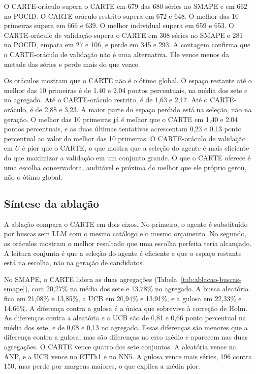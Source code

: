 O CARTE-oráculo supera o CARTE em 679 das 680 séries no SMAPE e em 662 no POCID. O CARTE-oráculo restrito supera em 672 e 648. O melhor das 10 primeiras supera em 666 e 639. O melhor individual supera em 659 e 653. O CARTE-oráculo de validação supera o CARTE em 308 séries no SMAPE e 281 no POCID, empata em 27 e 106, e perde em 345 e 293. A contagem confirma que o CARTE-oráculo de validação não é uma alternativa. Ele vence menos da metade das séries e perde mais do que vence.

Os oráculos mostram que o CARTE não é o ótimo global. O espaço restante até o melhor das 10 primeiras é de 1,40 e 2,04 pontos percentuais, na média dos sete e no agregado. Até o CARTE-oráculo restrito, é de 1,63 e 2,17. Até o CARTE-oráculo, é de 2,88 e 3,23. A maior parte do espaço perdido está na seleção, não na geração. O melhor das 10 primeiras já é melhor que o CARTE em 1,40 e 2,04 pontos percentuais, e as duas últimas tentativas acrescentam 0,23 e 0,13 ponto percentual ao valor do melhor das 10 primeiras. O CARTE-oráculo de validação em $U$ é pior que o CARTE, o que mostra que a seleção do agente é mais eficiente do que maximizar a validação em um conjunto grande. O que o CARTE oferece é uma escolha conservadora, auditável e próxima do melhor que ele próprio gerou, não o ótimo global.
\subsection{Síntese da ablação} \label{subsec:sintese-ablacao}

A ablação compara o CARTE em dois eixos. No primeiro, o agente é substituído por buscas sem LLM com o mesmo catálogo e o mesmo orçamento. No segundo, os oráculos mostram o melhor resultado que uma escolha perfeita teria alcançado. A leitura conjunta é que a seleção do agente é eficiente e que o espaço restante está na escolha, não na geração de candidatos.

No SMAPE, o CARTE lidera as duas agregações (Tabela~\ref{tab:ablacao-buscas-smape}), com 20,27\% na média dos sete e 13,78\% no agregado. A busca aleatória fica em 21,08\% e 13,85\%, a UCB em 20,94\% e 13,91\%, e a gulosa em 22,33\% e 14,66\%. A diferença contra a gulosa é a única que sobrevive à correção de Holm. As diferenças contra a aleatória e a UCB são de 0,81 e 0,66 ponto percentual na média dos sete, e de 0,08 e 0,13 no agregado. Essas diferenças são menores que a diferença contra a gulosa, mas são diferenças no erro médio e aparecem nas duas agregações. O CARTE vence quatro dos sete conjuntos. A aleatória vence na ANP, e a UCB vence no ETTh1 e no NN5. A gulosa vence mais séries, 196 contra 150, mas perde por margens maiores, o que explica a média pior.

